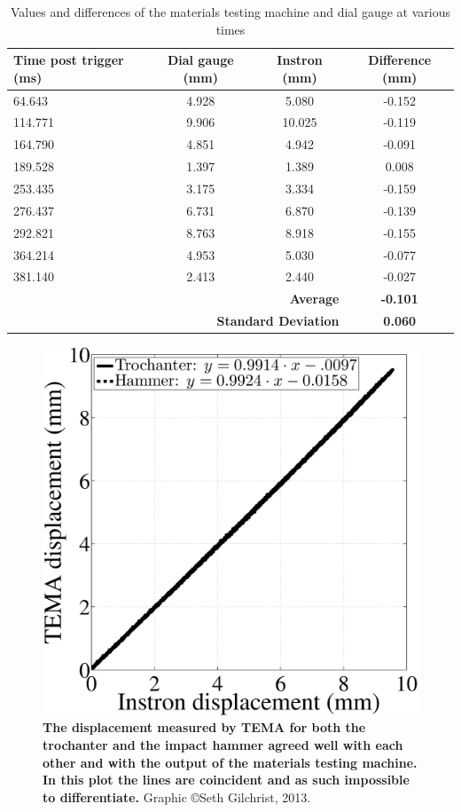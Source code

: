 \begin{table}
\centering
\caption[Materials testing machine position verification]{Values and differences of the materials testing machine and dial gauge at various times}
\label{tab:equipment_position}
\begin{tabular}{l c c c }
	\toprule
	Time post trigger (\ac{ms}) & Dial gauge (\ac{mm}) & Instron (\ac{mm}) & Difference (mm) \\ \midrule
	64.643                      & 4.928         & 5.080              & -0.152 \\
	114.771                     & 9.906          & 10.025           & -0.119 \\
	164.790                      & 4.851         & 4.942            & -0.091 \\
	189.528                     & 1.397          & 1.389            & 0.008 \\
	253.435                     & 3.175          & 3.334            & -0.159 \\
	276.437                    & 6.731          & 6.870            & -0.139 \\
	292.821                     & 8.763          & 8.918            & -0.155 \\
	364.214                     & 4.953          & 5.030            & -0.077 \\
	381.140                      & 2.413          & 2.440            & -0.027 \\ 
\multicolumn{3}{r}{\textbf{Average}}								 & \textbf{-0.101} \\
\multicolumn{3}{r}{\textbf{Standard Deviation}}						 & \textbf{ 0.060} \\
\bottomrule
\end{tabular}
\end{table}

\begin{figure}
\centering
\includegraphics[width=0.55\linewidth]{./appendixSupport/Figures/PlotInsTEMA}
\caption[TEMA measured displacement verification]{\textbf{The displacement measured by TEMA for both the trochanter and the impact hammer agreed well with each other and with the output of the materials testing machine. In this plot the lines are coincident and as such impossible to differentiate.} Graphic \copyright Seth Gilchrist, 2013.}
\label{fig:PlotInsTEMA}
\end{figure}
